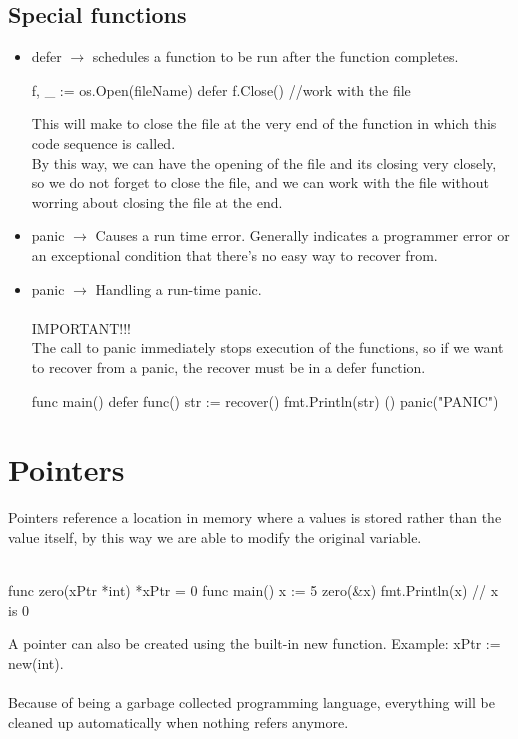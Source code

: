 \documentclass[twoside,a4paper,english]{report}
\begin{document}
\section{Special functions}
\begin{itemize}
\item defer $\rightarrow$ schedules a function to be run after the function completes.
\begin{go}
f, _ := os.Open(fileName)
  defer f.Close()
  //work with the file
\end{go}
This will make to close the file at the very end of the function in which this code sequence is called. \\
By this way, we can have the opening of the file and its closing very closely, so we do not forget to close the file, and we can work with the file without worring about closing the file at the end.
\item panic $\rightarrow$ Causes a run time error. Generally indicates a programmer error or an exceptional condition that there's no easy way to recover from.
\item panic $\rightarrow$ Handling a run-time panic.\\\\
{\color{my_blue}IMPORTANT!!!}\\ 
The call to panic immediately stops execution of the functions, so if we want to recover from a panic, the recover must be in a defer function.
\begin{go}
func main() {
  defer func() {
    str := recover()
    fmt.Println(str)
  }()
  panic("PANIC")
}
\end{go}
\end{itemize}
\chapter{Pointers}
Pointers reference a location in memory where a values is stored rather than the value itself, by this way we are able to modify the original variable.\\\\
\begin{go}
func zero(xPtr *int) {
  *xPtr = 0
}
func main() {
  x := 5
  zero(&x)
  fmt.Println(x) // x is 0
}
\end{go}
A pointer can also be created using the built-in new function. Example: xPtr := new(int).\\\\

Because of being a garbage collected programming language, everything will be cleaned up automatically when nothing refers anymore.\\\\
\end{document}
